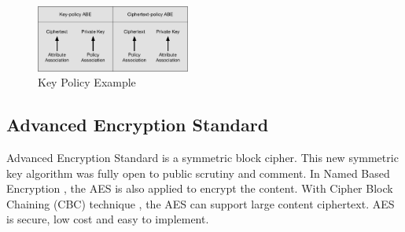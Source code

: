 \begin{figure}
  \centering
  \includegraphics[width=0.45\textwidth]{Figures/KPandCPABE}
  \caption{Key Policy Example}
  \label{fig:KPandCPABE}
\end{figure}

\subsection{Advanced Encryption Standard}
Advanced Encryption Standard \cite{biham1997advanced} is a symmetric block cipher. This new symmetric key algorithm was fully open to public scrutiny and comment. In Named Based Encryption \cite{yu2015name}, the AES is also applied to encrypt the content. With Cipher Block Chaining (CBC) technique \cite{bellare1994security}, the AES can support large content ciphertext. AES is secure, low cost and easy to implement.
